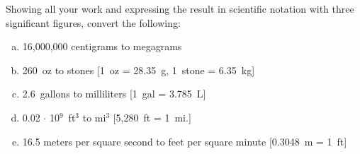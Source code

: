 \documentclass[11pt,letterpaper]{article}
\begin{document}
\newpage



 Showing all your work and expressing the result in scientific notation with three significant figures, convert the following:
	\begin{enumerate}[(a)]
	\item 16,000,000 centigrams to megagrams
	\item 260~oz to stones [1~oz = 28.35~g, 1~stone = 6.35~kg]
	\item 2.6~gallons to milliliters [1~gal = 3.785~L]
	\item 0.02 $\cdot$ 10$^9$~ft$^3$ to mi$^3$ [5,280~ft = 1~mi.]
	\item 16.5 meters per square second to feet per square minute [0.3048~m = 1~ft]
	\end{enumerate} \pspace
\end{document}
